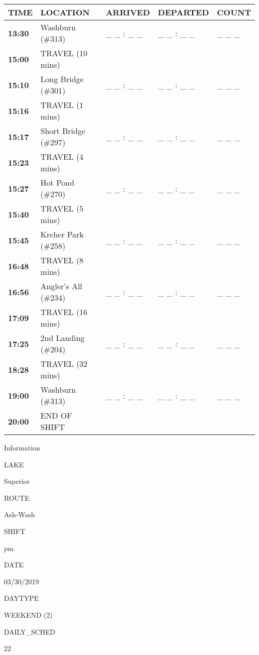 \documentclass[]{article}
\begin{document}
\begin{tabular}{>{\bfseries}lllll}
\toprule
\textbf{TIME} & \textbf{LOCATION} & \textbf{ARRIVED} & \textbf{DEPARTED} & \textbf{COUNT}\\
\midrule
13:30 & Washburn (\#313) & \_ \_ : \_ \_ & \_ \_ : \_ \_ & \_ \_ \_\\
15:00 & TRAVEL (10 mins) &  &  & \\
15:10 & Long Bridge (\#301) & \_ \_ : \_ \_ & \_ \_ : \_ \_ & \_ \_ \_\\
15:16 & TRAVEL (1 mins) &  &  & \\
15:17 & Short Bridge (\#297) & \_ \_ : \_ \_ & \_ \_ : \_ \_ & \_ \_ \_\\
15:23 & TRAVEL (4 mins) &  &  & \\
15:27 & Hot Pond (\#270) & \_ \_ : \_ \_ & \_ \_ : \_ \_ & \_ \_ \_\\
15:40 & TRAVEL (5 mins) &  &  & \\
15:45 & Kreher Park (\#258) & \_ \_ : \_ \_ & \_ \_ : \_ \_ & \_ \_ \_\\
16:48 & TRAVEL (8 mins) &  &  & \\
16:56 & Angler's All (\#234) & \_ \_ : \_ \_ & \_ \_ : \_ \_ & \_ \_ \_\\
17:09 & TRAVEL (16 mins) &  &  & \\
17:25 & 2nd Landing (\#204) & \_ \_ : \_ \_ & \_ \_ : \_ \_ & \_ \_ \_\\
18:28 & TRAVEL (32 mins) &  &  & \\
19:00 & Washburn (\#313) & \_ \_ : \_ \_ & \_ \_ : \_ \_ & \_ \_ \_\\
20:00 & END OF SHIFT &  &  & \\
\bottomrule
\end{tabular}\newpage

Information

LAKE

Superior

ROUTE

Ash-Wash

SHIFT

pm

DATE

03/30/2019

DAYTYPE

WEEKEND (2)

DAILY\_SCHED

22

\vspace{24pt}
\end{document}
